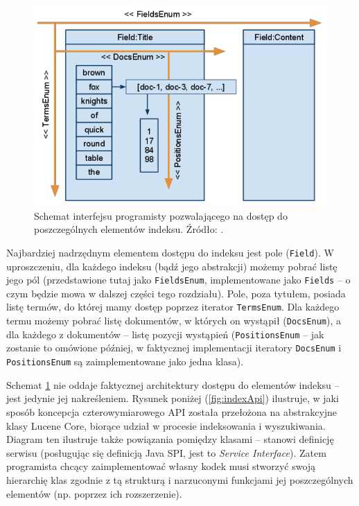\begin{figure}[here]
 \includegraphics[scale=0.5]{pictures/api.png}
 \caption{Schemat interfejsu programisty pozwalającego na dostęp do poszczególnych elementów indeksu. Źródło: \cite{flexindex}.\label{fig:4dimAPI}}
\end{figure}

Najbardziej nadrzędnym elementem dostępu do indeksu jest pole (\texttt{Field}). W uproszczeniu, dla każdego indeksu (bądź jego abstrakcji) możemy pobrać listę jego pól (przedstawione tutaj jako \texttt{FieldsEnum}, implementowane jako \texttt{Fields} -- o czym będzie mowa w dalszej części tego rozdziału). Pole, poza tytułem, posiada listę termów, do której mamy dostęp poprzez iterator \texttt{TermsEnum}. Dla każdego termu możemy pobrać listę dokumentów, w których on wystąpił (\texttt{DocsEnum}), a dla każdego z dokumentów -- listę pozycji wystąpień (\texttt{PositionsEnum} -- jak zostanie to omówione później, w faktycznej implementacji iteratory \texttt{DocsEnum} i \texttt{PositionsEnum} są zaimplementowane jako jedna klasa).

Schemat \ref{fig:4dimAPI} nie oddaje faktycznej architektury dostępu do elementów indeksu -- jest jedynie jej nakreśleniem. Rysunek poniżej (\ref{fig:indexApi}) ilustruje, w jaki sposób koncepcja czterowymiarowego API została przełożona na abstrakcyjne klasy Lucene Core, biorące udział w procesie indeksowania i wyszukiwania. Diagram ten ilustruje także powiązania pomiędzy klasami -- stanowi definicję serwisu (posługując się definicją Java SPI, jest to \emph{Service Interface}). Zatem programista chcący zaimplementować własny kodek musi stworzyć swoją hierarchię klas zgodnie z tą strukturą i narzuconymi funkcjami jej poszczególnych elementów (np. poprzez ich rozszerzenie).

